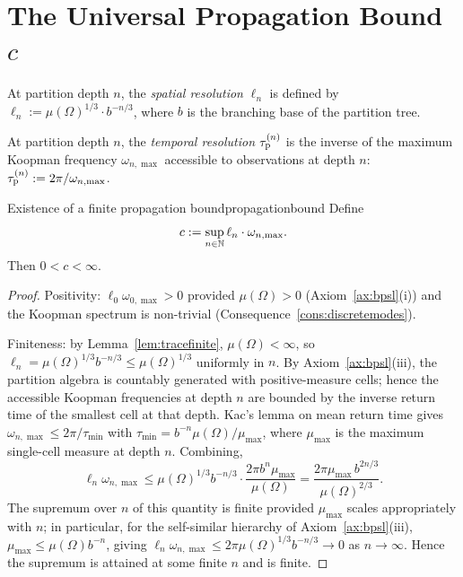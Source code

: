 \section{The Universal Propagation Bound $c$}
\label{sec:propagationbound}

\begin{definition}
\label{def:partitionspatial}
At partition depth $n$, the \emph{spatial resolution} $\ell_{n}$ is defined by $\ell_{n}:=\mu(\Omega)^{1/3}\cdot b^{-n/3}$, where $b$ is the branching base of the partition tree.
\end{definition}

\begin{definition}
\label{def:partitiontemporal}
At partition depth $n$, the \emph{temporal resolution} $\tau_{\mathrm{p}}^{(n)}$ is the inverse of the maximum Koopman frequency $\omega_{n,\max}$ accessible to observations at depth $n$: $\tau_{\mathrm{p}}^{(n)}:=2\pi/\omega_{n,\max}$.
\end{definition}

\begin{consequence}{Existence of a finite propagation bound}{propagationbound}
Define
\begin{equation}
c:=\sup_{n\in\mathbb{N}}\ell_{n}\cdot\omega_{n,\max}.
\label{eq:cdef}
\end{equation}
Then $0<c<\infty$.
\end{consequence}

\begin{proof}
Positivity: $\ell_{0}\omega_{0,\max}>0$ provided $\mu(\Omega)>0$ (Axiom~\ref{ax:bpsl}(i)) and the Koopman spectrum is non-trivial (Consequence~\ref{cons:discretemodes}).

Finiteness: by Lemma~\ref{lem:tracefinite}, $\mu(\Omega)<\infty$, so $\ell_{n}=\mu(\Omega)^{1/3}b^{-n/3}\le\mu(\Omega)^{1/3}$ uniformly in $n$. By Axiom~\ref{ax:bpsl}(iii), the partition algebra is countably generated with positive-measure cells; hence the accessible Koopman frequencies at depth $n$ are bounded by the inverse return time of the smallest cell at that depth. Kac's lemma \citep{kac1947} on mean return time gives $\omega_{n,\max}\le 2\pi/\tau_{\min}$ with $\tau_{\min}=b^{-n}\mu(\Omega)/\mu_{\max}$, where $\mu_{\max}$ is the maximum single-cell measure at depth $n$. Combining,
\begin{equation*}
\ell_{n}\omega_{n,\max}\le\mu(\Omega)^{1/3}b^{-n/3}\cdot\frac{2\pi b^{n}\mu_{\max}}{\mu(\Omega)}=\frac{2\pi\mu_{\max}\,b^{2n/3}}{\mu(\Omega)^{2/3}}.
\end{equation*}
The supremum over $n$ of this quantity is finite provided $\mu_{\max}$ scales appropriately with $n$; in particular, for the self-similar hierarchy of Axiom~\ref{ax:bpsl}(iii), $\mu_{\max}\le\mu(\Omega)b^{-n}$, giving $\ell_{n}\omega_{n,\max}\le 2\pi\mu(\Omega)^{1/3}b^{-n/3}\to 0$ as $n\to\infty$. Hence the supremum is attained at some finite $n$ and is finite.
\end{proof}

